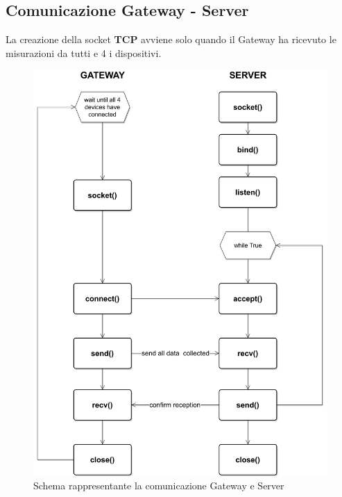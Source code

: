 \documentclass[a4paper,12pt]{report}
\begin{document}
\subsection{Comunicazione Gateway - Server}
La creazione della socket \textbf{TCP} avviene solo quando il Gateway ha ricevuto le misurazioni da tutti e 4 i dispositivi.
\begin{figure}[H]
    \begin{center}
        \centering
        \includegraphics[scale=0.5]{UML/GatewayServer.png}
    \end{center}
    \caption{Schema rappresentante la comunicazione Gateway e Server}
    \label{img:GatewayServer}
\end{figure}
\end{document}

